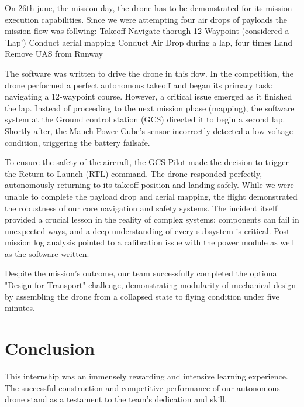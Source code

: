 \vspace*{.5cm}



On 26th june, the mission day, the drone has to be demonstrated for its mission execution capabilities. Since we were attempting four air drops of payloads the mission flow was follwing:
Takeoff
Navigate thorugh 12 Waypoint (considered a 'Lap')
Conduct aerial mapping
Conduct Air Drop during a lap, four times
Land
Remove UAS from Runway

The software was written to drive the drone in this flow.
In the competition, the drone performed a perfect autonomous takeoff and began its primary task: navigating a 12-waypoint course. However, a critical issue emerged as it finished the lap. Instead of proceeding to the next mission phase (mapping), the software system at the Ground control station (GCS) directed it to begin a second lap. Shortly after, the Mauch Power Cube's sensor incorrectly detected a low-voltage condition, triggering the battery failsafe.

To ensure the safety of the aircraft, the GCS Pilot made the decision to trigger the Return to Launch (RTL) command. The drone responded perfectly, autonomously returning to its takeoff position and landing safely. While we were unable to complete the payload drop and aerial mapping, the flight demonstrated the robustness of our core navigation and safety systems. The incident itself provided a crucial lesson in the reality of complex systems: components can fail in unexpected ways, and a deep understanding of every subsystem is critical. Post-mission log analysis pointed to a calibration issue with the power module as well as the software written.
\vspace*{.5cm}

Despite the mission's outcome, our team successfully completed the optional "Design for Transport" challenge, demonstrating modularity of mechanical design by assembling the drone from a collapsed state to flying condition under five minutes.

\section{Conclusion}

This internship was an immensely rewarding and intensive learning experience. The successful construction and competitive performance of our autonomous drone stand as a testament to the team's dedication and skill.

